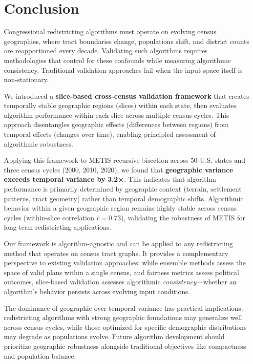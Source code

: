 \section{Conclusion}
\label{sec:conclusion}

Congressional redistricting algorithms must operate on evolving census geographies, where tract boundaries change, populations shift, and district counts are reapportioned every decade. Validating such algorithms requires methodologies that control for these confounds while measuring algorithmic consistency. Traditional validation approaches fail when the input space itself is non-stationary.

We introduced a \textbf{slice-based cross-census validation framework} that creates temporally stable geographic regions (slices) within each state, then evaluates algorithm performance within each slice across multiple census cycles. This approach disentangles geographic effects (differences between regions) from temporal effects (changes over time), enabling principled assessment of algorithmic robustness.

Applying this framework to METIS recursive bisection across 50 U.S. states and three census cycles (2000, 2010, 2020), we found that \textbf{geographic variance exceeds temporal variance by 3.2×}. This indicates that algorithm performance is primarily determined by geographic context (terrain, settlement patterns, tract geometry) rather than temporal demographic shifts. Algorithmic behavior within a given geographic region remains highly stable across census cycles (within-slice correlation $r=0.73$), validating the robustness of METIS for long-term redistricting applications.

Our framework is algorithm-agnostic and can be applied to any redistricting method that operates on census tract graphs. It provides a complementary perspective to existing validation approaches: while ensemble methods assess the space of valid plans within a single census, and fairness metrics assess political outcomes, slice-based validation assesses algorithmic \textit{consistency}—whether an algorithm's behavior persists across evolving input conditions.

The dominance of geographic over temporal variance has practical implications: redistricting algorithms with strong geographic foundations may generalize well across census cycles, while those optimized for specific demographic distributions may degrade as populations evolve. Future algorithm development should prioritize geographic robustness alongside traditional objectives like compactness and population balance.

